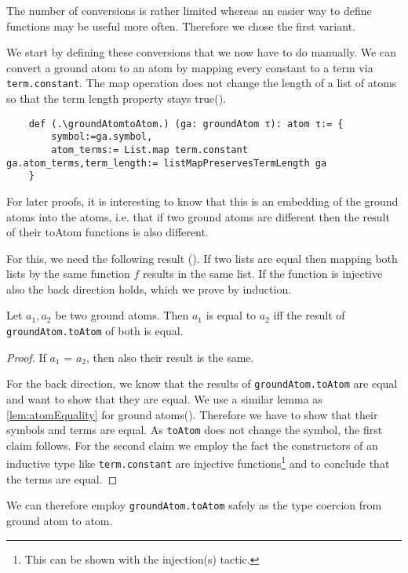 The number of conversions is rather limited whereas an easier way to define functions may be useful more often. Therefore we chose the first variant. 

We start by defining these conversions that we now have to do manually. We can convert a ground atom to an atom by mapping every constant to a term via \lstinline|term.constant|. The map operation does not change the length of a list of atoms so that the term length property stays true(\listMapPreservesTermLength).

\begin{lstlisting}
    def (.\groundAtomtoAtom.) (ga: groundAtom τ): atom τ:= {
        symbol:=ga.symbol, 
        atom_terms:= List.map term.constant ga.atom_terms,term_length:= listMapPreservesTermLength ga
    }
\end{lstlisting}

For later proofs, it is interesting to know that this is an embedding of the ground atoms into the atoms, i.e. that if two ground atoms are different then the result of their toAtom functions is also different.

For this, we need the following result (\listMapInjectiveEquality). If two lists are equal then mapping both lists by the same function $f$ results in the same list. If the function is injective also the back direction holds, which we prove by induction.

\begin{lemma}[\groundAtomToAtomEquality]
    Let $a_1, a_2$ be two ground atoms. Then $a_1$ is equal to $a_2$ iff the result of \lstinline|groundAtom.toAtom| of both is equal.
\end{lemma}
\begin{proof}
    If $a_1$ = $a_2$, then also their result is the same.

    For the back direction, we know that the results of \lstinline|groundAtom.toAtom| are equal and want to show that they are equal. We use a similar lemma as \cref{lem:atomEquality} for ground atoms(\groundAtomEquality). Therefore we have to show that their symbols and terms are equal. As \lstinline|toAtom| does not change the symbol, the first claim follows. For the second claim we employ the fact the constructors of an inductive type like \lstinline|term.constant| are injective functions\footnote{This can be shown with the injection(s) tactic.} and \listMapInjectiveEquality to conclude that the terms are equal.
\end{proof}

We can therefore employ \lstinline|groundAtom.toAtom| safely as the type coercion from ground atom to atom.

